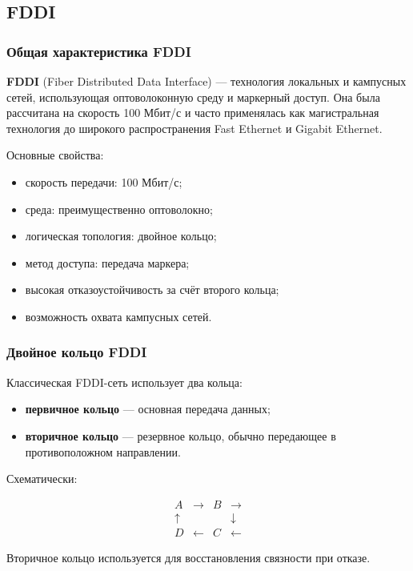 \documentclass[12pt,a4paper]{article}
\begin{document}
\subsection{FDDI}

\subsubsection{Общая характеристика FDDI}

\textbf{FDDI} (Fiber Distributed Data Interface) --- технология локальных и кампусных сетей, использующая оптоволоконную среду и маркерный доступ. Она была рассчитана на скорость 100 Мбит/с и часто применялась как магистральная технология до широкого распространения Fast Ethernet и Gigabit Ethernet.

Основные свойства:
\begin{itemize}
    \item скорость передачи: 100 Мбит/с;
    \item среда: преимущественно оптоволокно;
    \item логическая топология: двойное кольцо;
    \item метод доступа: передача маркера;
    \item высокая отказоустойчивость за счёт второго кольца;
    \item возможность охвата кампусных сетей.
\end{itemize}

\subsubsection{Двойное кольцо FDDI}

Классическая FDDI-сеть использует два кольца:
\begin{itemize}
    \item \textbf{первичное кольцо} --- основная передача данных;
    \item \textbf{вторичное кольцо} --- резервное кольцо, обычно передающее в противоположном направлении.
\end{itemize}

Схематически:

\[
\begin{array}{cccc}
A & \rightarrow & B & \rightarrow \\
\uparrow & & & \downarrow \\
D & \leftarrow & C & \leftarrow
\end{array}
\]

Вторичное кольцо используется для восстановления связности при отказе.
\end{document}
